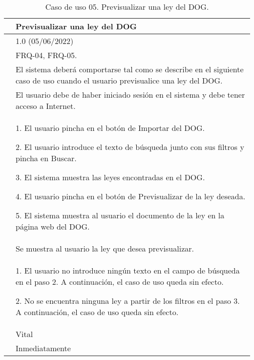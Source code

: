 \begin{table}[H]
\begin{center}
\begin{tabular}{|p{3cm}|p{10cm}|} \hline
\centering {\bf UC-05} & Previsualizar una ley del DOG  \\ \hline\hline
\centering {\bf Versión} & 1.0 (05/06/2022) \\ \hline
\centering {\bf Dependencias} &  FRQ-04, FRQ-05. \\ \hline
\centering {\bf Descripción} &  El sistema deberá comportarse tal como se describe en el siguiente caso de uso cuando el usuario previsualice una ley del DOG. \\ \hline
\centering {\bf Precondición} &  El usuario debe de haber iniciado sesión en el sistema y debe tener acceso a Internet. \\ \hline
\centering {\bf Secuencia normal} &  
1. El usuario pincha en el botón de Importar del DOG.

2. El usuario introduce el texto de búsqueda junto con sus filtros y pincha en Buscar.

3. El sistema muestra las leyes encontradas en el DOG.

4. El usuario pincha en el botón de Previsualizar de la ley deseada.

5. El sistema muestra al usuario el documento de la ley en la página web del DOG.
\\ \hline
\centering {\bf Postcondición} &  Se muestra al usuario la ley que desea previsualizar. \\ \hline
\centering {\bf Excepciones} & 
1. El usuario no introduce ningún texto en el campo de búsqueda en el paso 2. A continuación, el caso de uso queda sin efecto.

2. No se encuentra ninguna ley a partir de los filtros en el paso 3. A continuación, el caso de uso queda sin efecto.
\\ \hline
\centering {\bf Importancia} & Vital \\ \hline
\centering {\bf Urgencia} & Inmediatamente \\ \hline
\end{tabular}
\caption{Caso de uso 05. Previsualizar una ley del DOG.}
\label{enlaceUC5}
\end{center}
\end{table}

